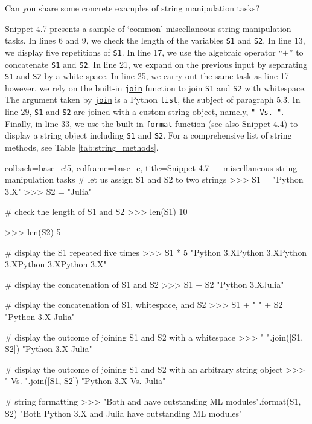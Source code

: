 \documentclass[a4paper,11pt]{book}
\newcommand{\question}[1]{%
    \begin{tcolorbox}[colback=comp_c!10,colframe=comp_c,sidebyside align=top,width=\linewidth,before skip=1ex]
        #1
    \end{tcolorbox}
    \switchcolumn%
}
\newcommand{\note}[1]{%
    \begin{tcolorbox}[colback=white!0,colframe=white!10,width=\linewidth,before skip=1ex]
        #1
    \end{tcolorbox}
}
\begin{document}
\begin{paracol}{2}
	\question{\raggedright Can you share some concrete examples of string manipulation tasks?}
		\note{Snippet 4.7 presents a sample of `common' miscellaneous string manipulation tasks. In lines 6 and 9, we check the length of the variables \texttt{S1} and \texttt{S2}. In line 13, we display five repetitions of \texttt{S1}. In line 17, we use the algebraic operator ``$+$'' to concatenate \texttt{S1} and \texttt{S2}. In line 21, we expand on the previous input by separating \texttt{S1} and \texttt{S2} by a white-space. In line 25, we carry out the same task as line 17 --- however, we rely on the built-in \href{https://docs.python.org/3/library/stdtypes.html\#str.join}{\texttt{join}} function to join \texttt{S1} and \texttt{S2} with whitespace. The argument taken by \href{https://docs.python.org/3/library/stdtypes.html\#str.join}{\texttt{join}} is a Python \texttt{list}, the subject of paragraph 5.3. In line 29, \texttt{S1} and \texttt{S2} are joined with a custom string object, namely, \texttt{" Vs. "}. Finally, in line 33, we use the built-in \href{https://docs.python.org/3/library/stdtypes.html\#str.format}{\texttt{format}} function (see also Snippet 4.4) to display a string object including \texttt{S1} and \texttt{S2}. For a comprehensive list of string methods, see Table \ref{tab:string_methods}.}
\end{paracol}
\clearpage

\begin{pythoncode}[linenos=true,]{colback=base_c!5, colframe=base_c, title=\sffamily Snippet 4.7 --- miscellaneous string manipulation tasks}
# let us assign S1 and S2 to two strings
>>> S1 = "Python 3.X"
>>> S2 = "Julia"

# check the length of S1 and S2
>>> len(S1)
10

>>> len(S2)
5

# display the S1 repeated five times
>>> S1 * 5
"Python 3.XPython 3.XPython 3.XPython 3.XPython 3.X"

# display the concatenation of S1 and S2
>>> S1 + S2
"Python 3.XJulia"

# display the concatenation of S1, whitespace, and S2
>>> S1 + " " + S2
"Python 3.X Julia"

# display the outcome of joining S1 and S2 with a whitespace
>>> " ".join([S1, S2])
"Python 3.X Julia"

# display the outcome of joining S1 and S2 with an arbitrary string object
>>> " Vs. ".join([S1, S2])
"Python 3.X Vs. Julia"

# string formatting
>>> "Both {} and {} have outstanding ML modules".format(S1, S2) 
"Both Python 3.X and Julia have outstanding ML modules"
\end{pythoncode}
\end{document}

